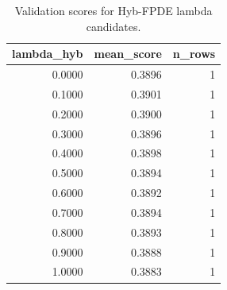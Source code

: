 \begin{table}[t]
\caption{Validation scores for Hyb-FPDE lambda candidates.}
\label{tab:lambda_distribution_computed}
\centering
\begin{tabular}{rrr}
\toprule
lambda\_hyb & mean\_score & n\_rows \\
\midrule
0.0000 & 0.3896 & 1 \\
0.1000 & 0.3901 & 1 \\
0.2000 & 0.3900 & 1 \\
0.3000 & 0.3896 & 1 \\
0.4000 & 0.3898 & 1 \\
0.5000 & 0.3894 & 1 \\
0.6000 & 0.3892 & 1 \\
0.7000 & 0.3894 & 1 \\
0.8000 & 0.3893 & 1 \\
0.9000 & 0.3888 & 1 \\
1.0000 & 0.3883 & 1 \\
\bottomrule
\end{tabular}

\end{table}
